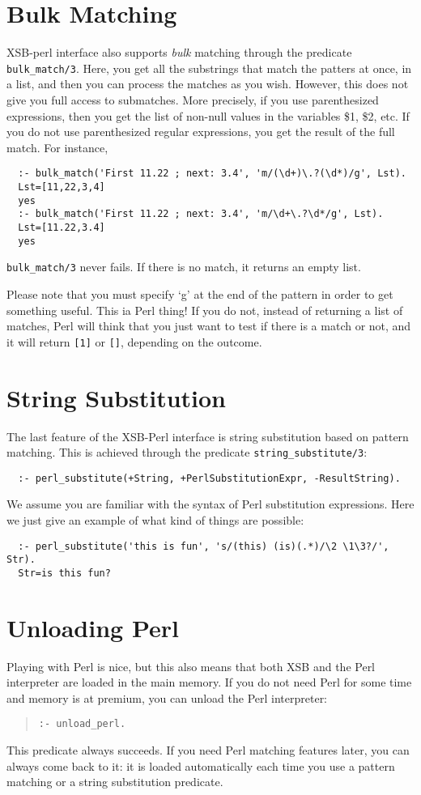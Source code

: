 \section{Bulk Matching}
XSB-perl interface also supports {\em bulk\/} matching through the
predicate {\tt bulk\_match/3}. Here, you get all
the substrings that match the patters at once, in a list, and then you can
process the matches as you wish. However, this does not give you full
access to submatches. More precisely, if you use parenthesized expressions,
then you get the list of non-null values in the variables \$1, \$2, etc.
If you do not use parenthesized regular expressions, you get the result of
the full match. For instance,
\begin{verbatim}
  :- bulk_match('First 11.22 ; next: 3.4', 'm/(\d+)\.?(\d*)/g', Lst).
  Lst=[11,22,3,4]
  yes
  :- bulk_match('First 11.22 ; next: 3.4', 'm/\d+\.?\d*/g', Lst).
  Lst=[11.22,3.4]
  yes
\end{verbatim}
{\tt bulk\_match/3} never fails. If there is no match, it returns an empty
list. 

Please note that you must specify `g' at the end of the pattern in order to
get something useful. This ia Perl thing! If you do not, instead of
returning a list of matches, Perl will think that you just want to test if
there is a match or not, and it will return \verb|[1]| or \verb|[]|,
depending on the outcome.

\section{String Substitution}
The last feature of the XSB-Perl interface is string substitution based on
pattern matching. This is achieved through the predicate
{\tt string\_substitute/3}: 

\begin{verbatim}
  :- perl_substitute(+String, +PerlSubstitutionExpr, -ResultString).
\end{verbatim}

We assume you are familiar with the syntax of Perl substitution
expressions. Here we just give an example of what kind of things are
possible:

\begin{verbatim}
  :- perl_substitute('this is fun', 's/(this) (is)(.*)/\2 \1\3?/', Str).
  Str=is this fun?
\end{verbatim}

\section{Unloading Perl}
Playing with Perl is nice, but this also means that both XSB and the Perl
interpreter  are loaded in the main memory. If you do not need Perl
for some time and memory is at premium, you can unload the Perl
interpreter:
\begin{quote}
   {\tt :- unload\_perl. }
\end{quote}
This predicate always succeeds. If you need Perl matching features later,
you can always come back to it: it is loaded automatically each time you
use a pattern matching or a string substitution predicate.

